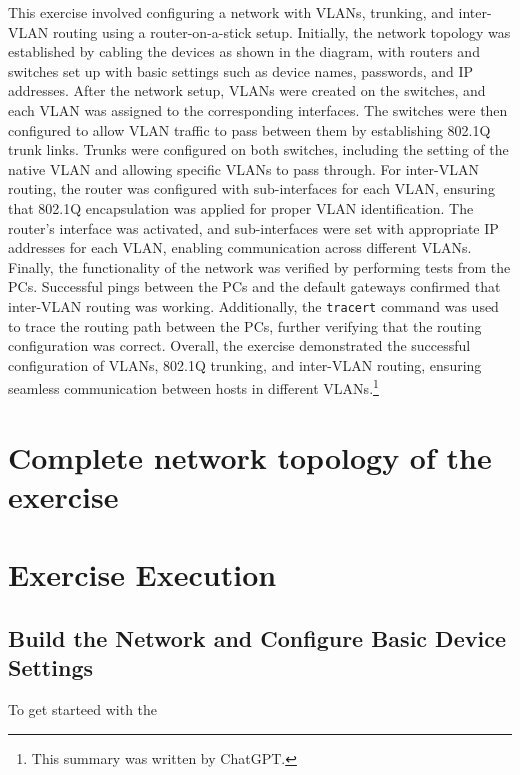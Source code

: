\documentclass[a4paper]{article}
\newcommand{\abc}{\hfill \break}
\begin{document}
This exercise involved configuring a network with VLANs, trunking, and inter-VLAN routing using a router-on-a-stick setup. Initially, the network topology was established by cabling the devices as shown in the diagram, with routers and switches set up with basic settings such as device names, passwords, and IP addresses.\abc
After the network setup, VLANs were created on the switches, and each VLAN was assigned to the corresponding interfaces. The switches were then configured to allow VLAN traffic to pass between them by establishing 802.1Q trunk links. Trunks were configured on both switches, including the setting of the native VLAN and allowing specific VLANs to pass through.\abc
For inter-VLAN routing, the router was configured with sub-interfaces for each VLAN, ensuring that 802.1Q encapsulation was applied for proper VLAN identification. The router's interface was activated, and sub-interfaces were set with appropriate IP addresses for each VLAN, enabling communication across different VLANs.\abc
Finally, the functionality of the network was verified by performing tests from the PCs. Successful pings between the PCs and the default gateways confirmed that inter-VLAN routing was working. Additionally, the \texttt{tracert} command was used to trace the routing path between the PCs, further verifying that the routing configuration was correct.\abc
Overall, the exercise demonstrated the successful configuration of VLANs, 802.1Q trunking, and inter-VLAN routing, ensuring seamless communication between hosts in different VLANs.\footnote{This summary was written by ChatGPT.}


\newpage

\section{Complete network topology of the exercise}

\newpage

\section{Exercise Execution}
\subsection{Build the Network and Configure Basic Device Settings}
To get starteed with the 
\end{document}
